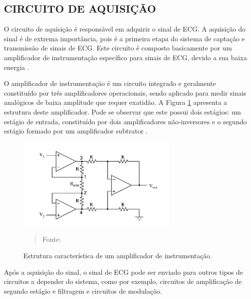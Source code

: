\documentclass[12pt, a4paper]{article}
\begin{document}

\subsection{CIRCUITO DE AQUISIÇÃO}
\hspace*{0.8cm} O circuito de aquisição é responsável em adquirir o sinal de ECG. A aquisição do sinal é de extrema importância, pois é a primeira etapa do sistema de captação e transmissão de sinais de ECG. Este circuito é composto basicamente por um amplificador de instrumentação específico para sinais de ECG, devido a sua baixa energia \cite{pds}.


O amplificador de instrumentação é um circuito integrado e geralmente constituído por três amplificadores operacionais, sendo aplicado para medir sinais analógicos de baixa amplitude que requer exatidão. A Figura \ref{fig:cir} apresenta a estrutura deste amplificador. Pode se observar que este possui dois estágios: um estágio de entrada, constituído por dois amplificadores não-inversores e o segundo estágio formado por um amplificador subtrator \cite{veloso}. 

\begin{figure}[!htb]
\begin{center}
			\caption{Estrutura característica de um amplificador de instrumentação.}
			\includegraphics[width=.5\textwidth]{Figuras/circuito.png}
            \vspace*{\fill} 
            \begin{quote} 
            \centering 
            Fonte: \cite{sugi}
            \end{quote}
            \vspace*{\fill}
			\label{fig:cir}
\end{center}
\end{figure}

Após a aquisição do sinal, o sinal de ECG pode ser enviado para outros tipos de circuitos a depender do sistema, como por exemplo, circuitos de amplificação de segundo estágio e filtragem e circuitos de modulação.
\end{document}
